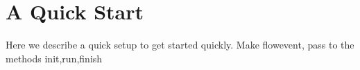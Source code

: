 \chapter{A Quick Start}
\label{quickstart}
Here we describe a quick setup to get started quickly.
Make flowevent, pass to the methods init,run,finish
